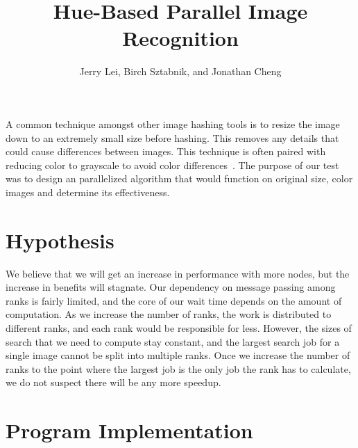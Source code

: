 \documentclass[10pt, journal]{vgtc}                %
\title{Hue-Based Parallel Image Recognition}
\author{Jerry Lei, Birch Sztabnik, and Jonathan Cheng}
\begin{document}


\maketitle


A common technique amongst other image hashing tools is to resize the image down to an extremely small size before hashing. This removes any details that could cause differences between images. This technique is often paired with reducing color to grayscale to avoid color differences~\cite{DBLP:conf/iih-msp/YangGN06}. The purpose of our test was to design an parallelized algorithm that would function on original size, color images and determine its effectiveness. 

\section{Hypothesis}

We believe that we will get an increase in performance with more nodes, but the increase in benefits will stagnate. Our dependency on message passing among ranks is fairly limited, and the core of our wait time depends on the amount of computation. As we increase the number of ranks, the work is distributed to different ranks, and each rank would be responsible for less. However, the sizes of search that we need to compute stay constant, and the largest search job for a single image cannot be split into multiple ranks. Once we increase the number of ranks to the point where the largest job is the only job the rank has to calculate, we do not suspect there will be any more speedup. 

\section{Program Implementation}
\end{document}
